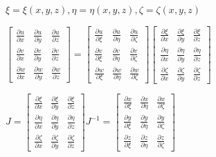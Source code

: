 \documentclass[11pt,letterpaper]{article}
\begin{document}
\begin{center}
$\xi=\xi(x,y,z),\eta=\eta(x,y,z),\zeta=\zeta(x,y,z)$

$\left[\begin{array}{ccc}
\frac{\partial u}{\partial x} & \frac{\partial u}{\partial y} & \frac{\partial u}{\partial z}\\
\frac{\partial v}{\partial x} & \frac{\partial v}{\partial y} & \frac{\partial v}{\partial z}\\
\frac{\partial w}{\partial x} & \frac{\partial w}{\partial y} & \frac{\partial w}{\partial z}
\end{array}\right]=\left[\begin{array}{ccc}
\frac{\partial u}{\partial\xi} & \frac{\partial u}{\partial\eta} & \frac{\partial u}{\partial\zeta}\\
\frac{\partial v}{\partial\xi} & \frac{\partial v}{\partial\eta} & \frac{\partial v}{\partial\zeta}\\
\frac{\partial w}{\partial\xi} & \frac{\partial w}{\partial\eta} & \frac{\partial w}{\partial\zeta}
\end{array}\right]\left[\begin{array}{ccc}
\frac{\partial\xi}{\partial x} & \frac{\partial\xi}{\partial y} & \frac{\partial\xi}{\partial z}\\
\frac{\partial\eta}{\partial x} & \frac{\partial\eta}{\partial y} & \frac{\partial\eta}{\partial z}\\
\frac{\partial\zeta}{\partial x} & \frac{\partial\zeta}{\partial y} & \frac{\partial\zeta}{\partial z}
\end{array}\right]$

$J=\left[\begin{array}{ccc}
\frac{\partial\xi}{\partial x} & \frac{\partial\xi}{\partial y} & \frac{\partial\xi}{\partial z}\\
\frac{\partial\eta}{\partial x} & \frac{\partial\eta}{\partial y} & \frac{\partial\eta}{\partial z}\\
\frac{\partial\zeta}{\partial x} & \frac{\partial\zeta}{\partial y} & \frac{\partial\zeta}{\partial z}
\end{array}\right]J^{-1}=\left[\begin{array}{ccc}
\frac{\partial x}{\partial\xi} & \frac{\partial x}{\partial\eta} & \frac{\partial x}{\partial\zeta}\\
\frac{\partial y}{\partial\xi} & \frac{\partial y}{\partial\eta} & \frac{\partial y}{\partial\zeta}\\
\frac{\partial z}{\partial\xi} & \frac{\partial z}{\partial\eta} & \frac{\partial z}{\partial\zeta}
\end{array}\right]$

\end{center}	
\end{document}
